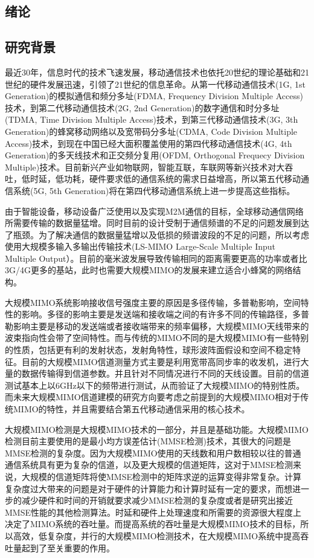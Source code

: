 \documentclass[bachelor,nocolorlinks, printoneside]{seuthesis} %
\begin{document}
\begin{Main} %

\chapter{绪论}
\section{研究背景}
最近30年，信息时代的技术飞速发展，移动通信技术也依托20世纪的理论基础和21世纪的硬件发展迅速，引领了21世纪的信息革命。从第一代移动通信技术(1G, 1st Generation)的模拟通信和频分多址(FDMA, Frequency Division Multiple Access)技术，到第二代移动通信技术(2G, 2nd Generation)的数字通信和时分多址(TDMA, Time Division Multiple Access)技术，到第三代移动通信技术(3G, 3th Generation)的蜂窝移动网络以及宽带码分多址(CDMA, Code Division Multiple Access)技术，到现在中国已经大面积覆盖使用的第四代移动通信技术(4G, 4th Generation)的多天线技术和正交频分复用(OFDM, Orthogonal Frequecy Division Multiple)技术。目前新兴产业如物联网，智能互联，车联网等新兴技术对大吞吐，低时延，低功耗，硬件要求低的通信系统的需求日益增高，所以第五代移动通信系统(5G, 5th Generation)将在第四代移动通信系统上进一步提高这些指标。

由于智能设备，移动设备广泛使用以及实现M2M通信的目标，全球移动通信网络所需要传输的数据量猛增。同时目前的设计受制于通信频谱的不足的问题发展到达了瓶颈。为了解决通信的数据量猛增以及低损的频谱波段的不足的问题，所以考虑使用大规模多输入多输出传输技术(LS-MIMO Large-Scale Multiple Input Multiple Output）。目前的毫米波发展导致传输相同的距离需要更高的功率或者比3G/4G更多的基站，此时也需要大规模MIMO的发展来建立适合小蜂窝的网络结构。\cite{zhang2018recent}

大规模MIMO系统影响接收信号强度主要的原因是多径传输，多普勒影响，空间特性的影响。多径的影响主要是发送端和接收端之间的有许多不同的传输路径，多普勒影响主要是移动的发送端或者接收端带来的频率偏移，大规模MIMO天线带来的波束指向性会带了空间特性。而与传统的MIMO不同的是大规模MIMO有一些特别的性质，包括更有利的发射状态，发射角特性，球形波阵面假设和空间不稳定特征。目前的大规模MIMO信道测量方式主要是利用宽带高同步率的收发机，进行大量的数据传输得到信道参数。并且针对不同情况进行不同的天线设置。目前的信道测试基本上以6GHz以下的频带进行测试，从而验证了大规模MIMO的特别性质。而未来大规模MIMO信道建模的研究方向要考虑之前提到的大规模MIMO相对于传统MIMO的特性，并且需要结合第五代移动通信采用的核心技术。

大规模MIMO检测是大规模MIMO技术的一部分，并且是基础功能。大规模MIMO检测目前主要使用的是最小均方误差估计(MMSE检测)技术，其很大的问题是MMSE检测的复杂度。因为大规模MIMO使用的天线数和用户数相较以往的普通通信系统具有更为复杂的信道，以及更大规模的信道矩阵，这对于MMSE检测来说，大规模的信道矩阵将使MMSE检测中的矩阵求逆的运算变得非常复杂。计算复杂度过大带来的问题是对于硬件的计算能力和计算时延有一定的要求，而想进一步的减少硬件和时间的开销就要求减少MMSE检测的复杂度或者是研究出接近MMSE性能的其他检测算法。时延和硬件上处理速度和所需要的资源很大程度上决定了MIMO系统的吞吐量。而提高系统的吞吐量是大规模MIMO技术的目标，所以高效，低复杂度，并行的大规模MIMO检测技术，在大规模MIMO系统中提高吞吐量起到了至关重要的作用。\cite{yang2015fifty}


\end{Main}
\end{document}
